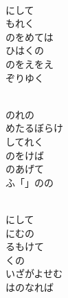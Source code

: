 \documentclass[10pt,b5j]{tarticle} %
\begin{document}
\begin{enumerate}
\begin{minipage}[c]{\blocksize}
    \end{minipage}
    \begin{minipage}[c]{\blocksize}
        
        \vspace{\linespace}
        \item~\\
        にして\\
        もれく\\
        のをめては\\
        ひはくの\\
        のをえをえ\\
        ぞりゆく
        
    \end{minipage}
    \begin{minipage}[c]{\blocksize}
        
        \vspace{\linespace}
        \item~\\
        のれの\\
        めたるぼらけ\\
        してれく\\
        のをけば\\
        のあげて\\
        ふ「」のの
        
    \end{minipage}
    \begin{minipage}[c]{\blocksize}
        
        \vspace{\linespace}
        \item~\\
        にして\\
        にむの\\
        るもけて\\
        くの\\
        いざがよせむ\\
        はのなれば
    
    \end{minipage}
\end{enumerate} %
\end{document}
